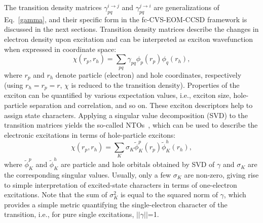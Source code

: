 \documentclass[journal=jctcce,manuscript=article]{achemso}
\begin{document}
The transition density matrices $\gamma^{i\to j}_{pq}$ and $\gamma^{j\to i}_{pq}$ are generalizations of Eq.~\eqref{gamma}, and their specific form in the fc-CVS-EOM-CCSD framework is discussed in the next sections.
{}
Transition density matrices describe  the changes in electron density upon excitation and 
can be interpreted as exciton wavefunction\cite{Luzanov:TDM-1:76,Luzanov:DMRev:12,Plasser2012,Plasser2014}
when expressed in coordinate space:
\begin{equation}
\chi(r_p,r_h) = \sum_{pq} \gamma_{pq} \phi_p(r_p) \phi_q(r_h),
\end{equation}
where $r_p$ and $r_h$ denote particle (electron) and hole coordinates,
respectively (using $r_h=r_p=r$, $\chi$ is reduced to the transition density).  
Properties of the exciton can be quantified by various expectation
values, i.e., exciton size, hole-particle separation and correlation, and so on.
These exciton descriptors help to assign state characters\cite{Plasser2012,Plasser2014,Plasser2014:1}.
Applying a singular value decomposition (SVD) to the transition matrices yields the so-called NTOs~\cite{Martin2003,Plasser2012,Plasser2014,Plasser2014:1,Bappler2014,Mewes2018}, which can be used to
describe the electronic excitations in terms of hole-particle excitons:
\begin{equation}
\chi(r_p,r_h) = \sum_K \sigma_K  \tilde{\phi}^p_K(r_p) \tilde{\phi}^h_K(r_h),
\end{equation}
where $\tilde \phi^p_K$ and $\tilde \phi^h_K$ are particle and hole orbitals obtained by SVD 
of $\gamma$ and $\sigma_K$  
are the corresponding  singular values. Usually, only a few
$\sigma_K$ are non-zero, giving rise to simple interpretation of excited-state characters
in terms of one-electron excitations. Note that the sum of $\sigma_K^2$ is equal to the squared norm of $\gamma$, which provides a simple metric quantifying the single-electron character of the transition, i.e., for pure single excitations, $||\gamma||$=1. 
\end{document}
